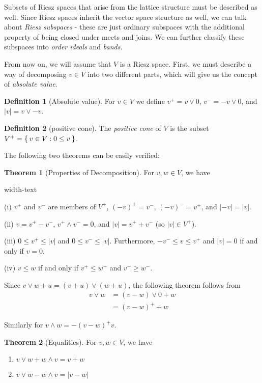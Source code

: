 \documentclass[letterpaper,10pt,oneside,onecolumn,reqno]{amsart}
\theoremstyle{definition}
\newtheorem{thm}{Theorem}
\newtheorem{defn}{Definition}
\newcommand{\meet}{\wedge}
\newcommand{\join}{\vee}
\begin{document}
Subsets of Riesz spaces that arise from the lattice structure must be
described as well. Since Riesz spaces inherit the vector space
structure as well, we can talk about \emph{Riesz subspaces} - these
are just ordinary subspaces with the additional property of being
closed under meets and joins. We can further classify these subspaces
into \emph{order ideals} and \emph{bands}.

From now on, we will assume that $V$ is a Riesz space. First, we must
describe a way of decomposing $v \in V$ into two different parts,
which will give us the concept of \emph{absolute value}.

\begin{framed}
  \begin{defn}[Absolute value]\label{def:7}
    For $v \in V$ we define $v^+=v \join 0$, $v^-=-v \join 0$, and
    $|v| = v \join -v$.
  \end{defn}

\begin{defn}[positive cone]\label{def:8}
  The \emph{positive cone} of $V$ is the subset $V^+
  = \Set{v \in V : 0 \leq v}$.
\end{defn}

The following two theorems can be easily verified:

\begin{thm}[Properties of Decomposition]
  \label{thr:1}
  For $v,w \in V$, we have
  \begin{deflist}{width-text}
  \item
  \item[(i)] $v^+$ and $v^-$ are members of $V^+$, $(-v)^+=v^-$,
    $(-v)^-=v^+$, and $|-v|=|v|$.
  \item[(ii)] $v = v^+ - v^-$, $v^+ \meet v^-=0$, and $|v| = v^++v^-$
    (so $|v| \in V^+$).
  \item[(iii)] $0 \leq v^+ \leq |v|$ and $0 \leq v^- \leq
    |v|$. Furthermore, $-v^- \leq v \leq v^+$ and $|v|=0$ if and only
  if $v=0$.
\item[(iv)] $v \leq w$ if and only if $v^+ \leq w^+$ and $v^- \geq
  w^-$.
\end{deflist}
\end{thm}
Since $v \join w + u = (v + u) \join (w + u)$, the following theorem
follows from
\begin{align*}
  v \join w &= (v-w) \join 0 + w \\
  &= (v-w)^+ + w
\end{align*}

Similarly for $v \meet w = -(v-w)^+ v$.

\begin{thm}[Equalities]
  \label{thr:2}
  For $v,w \in V$, we have
  \begin{enumerate}
  \item\label{item:1} $v \join w + w \meet v = v + w$
  \item\label{item:2} $v \join w - w \meet v = |v - w|$
  \end{enumerate}
\end{thm}

\end{framed}
\end{document}
